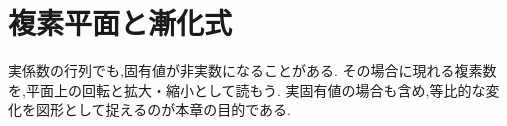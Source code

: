 \chapter{複素平面と漸化式}\label{章：複素平面と漸化式}
\begin{bookcolumns}
実係数の行列でも,固有値が非実数になることがある.
その場合に現れる複素数を,平面上の回転と拡大・縮小として読もう.
実固有値の場合も含め,等比的な変化を図形として捉えるのが本章の目的である.



\end{bookcolumns}
